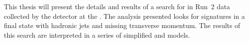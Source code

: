 This thesis will present the details and results of a search
for \SUSY in Run~2 data collected by the \CMS detector at the \LHC.
The analysis presented looks for \SUSY signatures in a final state
with hadronic jets and missing transverse momentum. The results of
this search are interpreted in a series of simplified \SUSY and \DM
models.

%
%

%

